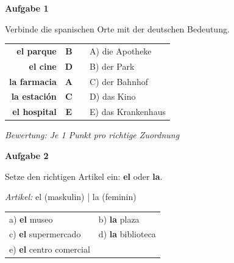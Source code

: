 \documentclass[11pt, a4paper]{article}
\newcommand{\fachfarbe}{spanisch}
\newcommand{\punktebox}[1]{\hfill\fbox{\small \_/#1}}
\newcommand{\loesung}[1]{\textcolor{loesung}{\textbf{#1}}}
\newenvironment{aufgabe}[1]{%
    \needspace{5\baselineskip}%
    \nopagebreak[4]%
    \vspace{10pt}
    \noindent\textbf{\textcolor{\fachfarbe}{Aufgabe #1}}
    \nopagebreak[4]%
    \vspace{5pt}
    \nopagebreak[4]%
    \begin{list}{}{\leftmargin=0pt}
    \item[]
}{%
    \end{list}
}
\newcommand{\es}[1]{\textcolor{\fachfarbe}{\textbf{#1}}}
\begin{document}
\vspace{10pt}


\begin{aufgabe}{1}
Verbinde die spanischen Orte mit der deutschen Bedeutung. \punktebox{5}
\end{aufgabe}

\begin{center}
\renewcommand{\arraystretch}{1.8}
\begin{tabular}{rcp{0.5cm}l}
\es{el parque} & \loesung{B} & & A) die Apotheke \\
\es{el cine} & \loesung{D} & & B) der Park \\
\es{la farmacia} & \loesung{A} & & C) der Bahnhof \\
\es{la estación} & \loesung{C} & & D) das Kino \\
\es{el hospital} & \loesung{E} & & E) das Krankenhaus \\
\end{tabular}
\end{center}

\vspace{0.5em}
\textit{\textcolor{grau}{Bewertung: Je 1 Punkt pro richtige Zuordnung}}

\vspace{15pt}


\begin{aufgabe}{2}
Setze den richtigen Artikel ein: \es{el} oder \es{la}. \punktebox{5}
\end{aufgabe}

\begin{vokabelkasten}
\textit{Artikel:} el (maskulin) | la (feminin)
\end{vokabelkasten}

\vspace{0.5em}

\noindent
\renewcommand{\arraystretch}{1.6}
\begin{tabular}{p{}p{}}
a) \loesung{el} museo & b) \loesung{la} plaza \\
c) \loesung{el} supermercado & d) \loesung{la} biblioteca \\
e) \loesung{el} centro comercial & \\
\end{tabular}
\end{document}
